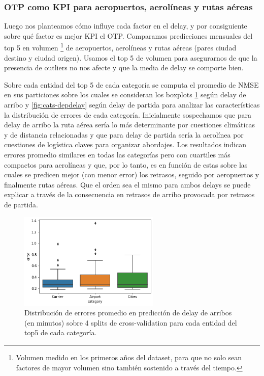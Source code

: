 \subsubsection{OTP como KPI para aeropuertos, aerolíneas y rutas aéreas}
Luego nos planteamos cómo influye cada factor en el delay, y por consiguiente sobre qué factor es mejor KPI el OTP. Comparamos predicciones mensuales del top 5 en volumen \footnote{Volumen medido en los primeros años del dataset, para que no solo sean factores de mayor volumen sino también sostenido a través del tiempo.} de aeropuertos, aerolíneas y rutas aéreas (pares ciudad destino y ciudad origen). Usamos el top 5 de volumen para asegurarnos de que la presencia de outliers no nos afecte y que la media de delay se comporte bien.

Sobre cada entidad del top 5 de cada categoría se computa el promedio de NMSE en sus particiones sobre los cuales se consideran los boxplots \ref{fig:cats-arrdelay} según delay de arribo y \ref{fig:cats-depdelay} según delay de partida para analizar las características la distribución de errores de cada categoría. Inicialmente sospechamos que para delay de arribo la ruta aérea sería lo más determinante por cuestiones climáticas y de distancia relacionadas y que para delay de partida sería la aerolínea por cuestiones de logística claves para organizar abordajes. Los resultados indican errores promedio similares en todas las categorías pero con cuartiles más compactos para aerolíneas y que, por lo tanto, es en función de estas sobre las cuales se predicen mejor (con menor error) los retrasos, seguido por aeropuertos y finalmente rutas aéreas. Que el orden sea el mismo para ambos delays se puede explicar a través de la consecuencia en retrasos de arribo provocada por retrasos de partida.

\begin{figure}[h]
  \includegraphics[width=0.6\textwidth, height=0.24\textheight]{./img/cats_arrdelay.png}
  \centering
  \caption{
  Distribución de errores promedio en predicción de delay de arribos (en minutos) sobre 4 splits de cross-validation para cada entidad del top5 de cada categoría.
  }
  \label{fig:cats-arrdelay}
\end{figure}

